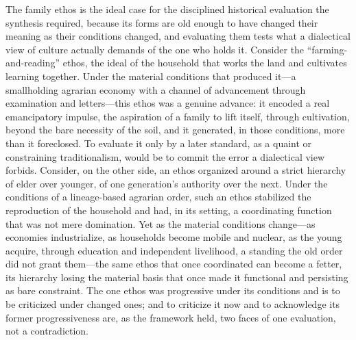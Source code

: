 The family ethos is the ideal case for the disciplined historical evaluation the synthesis required, because its forms are old enough to have changed their meaning as their conditions changed, and evaluating them tests what a dialectical view of culture actually demands of the one who holds it. Consider the ``farming-and-reading'' ethos, the ideal of the household that works the land and cultivates learning together. Under the material conditions that produced it---a smallholding agrarian economy with a channel of advancement through examination and letters---this ethos was a genuine advance: it encoded a real emancipatory impulse, the aspiration of a family to lift itself, through cultivation, beyond the bare necessity of the soil, and it generated, in those conditions, more than it foreclosed. To evaluate it only by a later standard, as a quaint or constraining traditionalism, would be to commit the error a dialectical view forbids. Consider, on the other side, an ethos organized around a strict hierarchy of elder over younger, of one generation's authority over the next. Under the conditions of a lineage-based agrarian order, such an ethos stabilized the reproduction of the household and had, in its setting, a coordinating function that was not mere domination. Yet as the material conditions change---as economies industrialize, as households become mobile and nuclear, as the young acquire, through education and independent livelihood, a standing the old order did not grant them---the same ethos that once coordinated can become a fetter, its hierarchy losing the material basis that once made it functional and persisting as bare constraint. The one ethos was progressive under its conditions and is to be criticized under changed ones; and to criticize it now and to acknowledge its former progressiveness are, as the framework held, two faces of one evaluation, not a contradiction.

